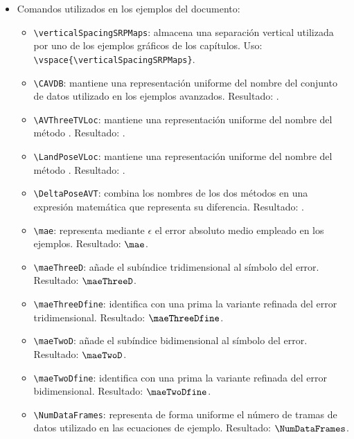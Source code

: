 \begin{itemize}
\begin{itemize}
    \item \texttt{\textbackslash{}triangv}: genera un triángulo orientado hacia abajo. Resultado: {\triangv}.
    \item \texttt{\textbackslash{}diamante}: genera un rombo utilizado como marcador gráfico. Resultado: {\diamante}.
    \item \texttt{\textbackslash{}argmax\{índice\}}: compone el operador matemático \texttt{argmax} colocando debajo el índice indicado. Uso y resultado: \texttt{\textbackslash{}argmax\{i\}} produce \(\argmax{i}\).
  \end{itemize}
  \item Comandos utilizados en los ejemplos del documento:
  \begin{itemize}
    \item \texttt{\textbackslash{}verticalSpacingSRPMaps}: almacena una separación vertical utilizada por uno de los ejemplos gráficos de los capítulos. Uso: \texttt{\textbackslash{}vspace\{\textbackslash{}verticalSpacingSRPMaps\}}.
    \item \texttt{\textbackslash{}CAVDB}: mantiene una representación uniforme del nombre del conjunto de datos utilizado en los ejemplos avanzados. Resultado: \CAVDB{}.
    \item \texttt{\textbackslash{}AVThreeTVLoc}: mantiene una representación uniforme del nombre del método \AVThreeTVLoc{}. Resultado: \AVThreeTVLoc{}.
    \item \texttt{\textbackslash{}LandPoseVLoc}: mantiene una representación uniforme del nombre del método \LandPoseVLoc{}. Resultado: \LandPoseVLoc{}.
    \item \texttt{\textbackslash{}DeltaPoseAVT}: combina los nombres de los dos métodos en una expresión matemática que representa su diferencia. Resultado: \DeltaPoseAVT{}.
    \item \texttt{\textbackslash{}mae}: representa mediante \(\epsilon\) el error absoluto medio empleado en los ejemplos. Resultado: \(\mae\).
    \item \texttt{\textbackslash{}maeThreeD}: añade el subíndice tridimensional al símbolo del error. Resultado: \(\maeThreeD\).
    \item \texttt{\textbackslash{}maeThreeDfine}: identifica con una prima la variante refinada del error tridimensional. Resultado: \(\maeThreeDfine\).
    \item \texttt{\textbackslash{}maeTwoD}: añade el subíndice bidimensional al símbolo del error. Resultado: \(\maeTwoD\).
    \item \texttt{\textbackslash{}maeTwoDfine}: identifica con una prima la variante refinada del error bidimensional. Resultado: \(\maeTwoDfine\).
    \item \texttt{\textbackslash{}NumDataFrames}: representa de forma uniforme el número de tramas de datos utilizado en las ecuaciones de ejemplo. Resultado: \(\NumDataFrames\).
  \end{itemize}
\end{itemize}

